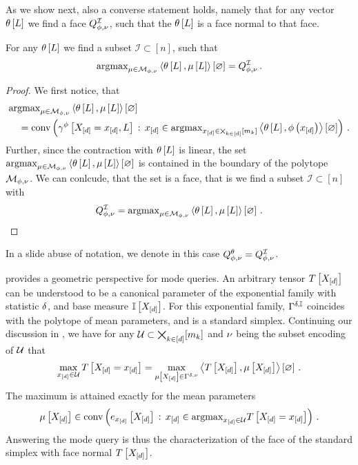 As we show next, also a converse statement holds, namely that for any vector $\theta\left[L\right]$ we find a face $Q^{\mathcal{I}}_{\phi,\nu}$, such that the $\theta\left[L\right]$ is a face normal to that face.

\begin{theorem}
    \label{the:modeQueryFaceBM}
    For any $\theta\left[L\right]$ we find a subset $\mathcal{I}\subset[n]$, such that
    \begin{align*}
        \mathrm{argmax}_{\mu\in\mathcal{M}_{\phi,\nu}}\left\langle \theta\left[L\right],\mu\left[L\right]\right\rangle \left[ \varnothing \right] = Q^{\mathcal{I}}_{\phi,\nu} \, .
    \end{align*}
\end{theorem}
\begin{proof} %
    We first notice, that
    \begin{align*}
       & \mathrm{argmax}_{\mu\in\mathcal{M}_{\phi,\nu}}\left\langle \theta\left[L\right],\mu\left[L\right]\right\rangle \left[ \varnothing \right] \\
       & \quad  = \mathrm{conv}\left(\gamma^{\phi}\left[X_{[d]}=x_{[d]},L\right] \, : \, x_{[d]}\in\mathrm{argmax}_{x_{[d]}\in\bigtimes_{k\in[d]}[m_{k}]} \left\langle \theta\left[L\right],\phi\left(x_{[d]}\right)\right\rangle \left[ \varnothing \right]\right) \, .
    \end{align*}
    Further, since the contraction with $\theta\left[L\right]$ is linear, the set $\mathrm{argmax}_{\mu\in\mathcal{M}_{\phi,\nu}}\left\langle \theta\left[L\right],\mu\left[L\right]\right\rangle \left[ \varnothing \right]$ is contained in the boundary of the polytope $\mathcal{M}_{\phi,\nu}$.
    We can conlcude, that the set is a face, that is we find a subset $\mathcal{I}\subset[n]$ with
    \begin{align*}
        Q^{\mathcal{I}}_{\phi,\nu} = \mathrm{argmax}_{\mu\in\mathcal{M}_{\phi,\nu}}\left\langle \theta\left[L\right],\mu\left[L\right]\right\rangle \left[ \varnothing \right] \, .
    \end{align*}
\end{proof}

In a slide abuse of notation, we denote in this case $Q^{\theta}_{\phi,\nu} = Q^{\mathcal{I}}_{\phi,\nu}$.

 provides a geometric perspective for mode queries.
An arbitrary tensor $T\left[X_{[d]}\right]$ can be understood to be a canonical parameter of the exponential family with statistic $\delta$, and base measure $\mathbb{I}\left[X_{[d]}\right]$.
For this exponential family, $\Gamma^{\delta,\mathbb{I}}$ coincides with the polytope of mean parameters, and is a standard simplex.
Continuing our discussion in , we have for any $\mathcal{U}\subset\bigtimes_{k\in[d]}[m_{k}]$ and $\nu$ being the subset encoding of $\mathcal{U}$ that
\begin{align*}
    \max_{x_{[d]}\in\mathcal{U}} T\left[X_{[d]}=x_{[d]}\right] =
    \max_{\mu\left[X_{[d]}\right]\in\Gamma^{\delta,\nu}} \left\langle T\left[X_{[d]}\right],\mu\left[X_{[d]}\right]\right\rangle \left[ \varnothing \right] \, .
\end{align*}
The maximum is attained exactly for the mean parameters
\begin{align*}
    \mu\left[X_{[d]}\right]\in
    \mathrm{conv}\left(e_{x_{[d]}}\left[X_{[d]}\right] \, : \, x_{[d]}\in\mathrm{argmax}_{x_{[d]}\in\mathcal{U}} T\left[X_{[d]}=x_{[d]}\right]\right) \, .
\end{align*}
Answering the mode query is thus the characterization of the face of the standard simplex with face normal $T\left[X_{[d]}\right]$.

